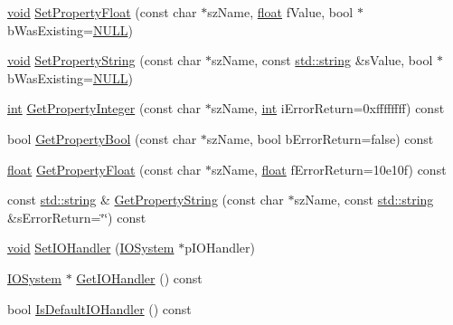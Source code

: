 \begin{DoxyCompactItemize}
\item 
\hyperlink{wglew_8h_aeea6e3dfae3acf232096f57d2d57f084}{void} \hyperlink{class_assimp_1_1_importer_ab264807393b68662d1672c2b05e1c0cd}{Set\-Property\-Float} (const char $\ast$sz\-Name, \hyperlink{fmod_8h_aeb841aa4b4b5f444b5d739d865b420af}{float} f\-Value, bool $\ast$b\-Was\-Existing=\hyperlink{ftobjs_8h_a070d2ce7b6bb7e5c05602aa8c308d0c4}{N\-U\-L\-L})
\item 
\hyperlink{wglew_8h_aeea6e3dfae3acf232096f57d2d57f084}{void} \hyperlink{class_assimp_1_1_importer_a8f79ecb5c6f67a76fc87654c32986e8e}{Set\-Property\-String} (const char $\ast$sz\-Name, const \hyperlink{glew_8h_ae84541b4f3d8e1ea24ec0f466a8c568b}{std\-::string} \&s\-Value, bool $\ast$b\-Was\-Existing=\hyperlink{ftobjs_8h_a070d2ce7b6bb7e5c05602aa8c308d0c4}{N\-U\-L\-L})
\item 
\hyperlink{wglew_8h_a500a82aecba06f4550f6849b8099ca21}{int} \hyperlink{class_assimp_1_1_importer_a3e796a0758a9f10f13107f44c542ad41}{Get\-Property\-Integer} (const char $\ast$sz\-Name, \hyperlink{wglew_8h_a500a82aecba06f4550f6849b8099ca21}{int} i\-Error\-Return=0xffffffff) const 
\item 
bool \hyperlink{class_assimp_1_1_importer_a90f5d35d25e5d2a0ef8bc0c6545b2010}{Get\-Property\-Bool} (const char $\ast$sz\-Name, bool b\-Error\-Return=false) const 
\item 
\hyperlink{fmod_8h_aeb841aa4b4b5f444b5d739d865b420af}{float} \hyperlink{class_assimp_1_1_importer_a9a99a3467d6386ddcfbe2823f16b6640}{Get\-Property\-Float} (const char $\ast$sz\-Name, \hyperlink{fmod_8h_aeb841aa4b4b5f444b5d739d865b420af}{float} f\-Error\-Return=10e10f) const 
\item 
const \hyperlink{glew_8h_ae84541b4f3d8e1ea24ec0f466a8c568b}{std\-::string} \& \hyperlink{class_assimp_1_1_importer_a4d64ee7131d6c26dc9688de85d142f14}{Get\-Property\-String} (const char $\ast$sz\-Name, const \hyperlink{glew_8h_ae84541b4f3d8e1ea24ec0f466a8c568b}{std\-::string} \&s\-Error\-Return=\char`\"{}\char`\"{}) const 
\item 
\hyperlink{wglew_8h_aeea6e3dfae3acf232096f57d2d57f084}{void} \hyperlink{class_assimp_1_1_importer_a1161f46318af18bb86dfe0fc3edea4df}{Set\-I\-O\-Handler} (\hyperlink{class_assimp_1_1_i_o_system}{I\-O\-System} $\ast$p\-I\-O\-Handler)
\item 
\hyperlink{class_assimp_1_1_i_o_system}{I\-O\-System} $\ast$ \hyperlink{class_assimp_1_1_importer_abe3af30f4c5eae2e875b0f32068be44d}{Get\-I\-O\-Handler} () const 
\item 
bool \hyperlink{class_assimp_1_1_importer_ae3f26466cf7756594216ffedbc247563}{Is\-Default\-I\-O\-Handler} () const 

\end{DoxyCompactItemize}
